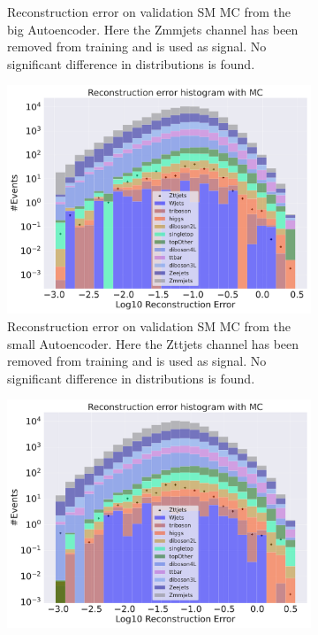 \begin{figure}[H]
\begin{subfigure}{.45\textwidth}
        \caption{Reconstruction error on validation SM MC from the big Autoencoder. Here the Zmmjets channel has been removed from training and 
        is used as signal. No significant difference in distributions is found. }
        \label{fig:vae_big_Zmmjets}
    \end{subfigure}
    \hfill
    \begin{subfigure}{.45\textwidth}
        \includegraphics[width=\textwidth]{Figures/VAE_testing/small/b_data_recon_big_rm3_feats_sig_Zttjets.pdf}
        \caption{Reconstruction error on validation SM MC from the small Autoencoder. Here the Zttjets channel has been removed from training and 
        is used as signal. No significant difference in distributions is found. }
        \label{fig:vae_small_Zttjets}
    \end{subfigure}
    \hfill 
    \begin{subfigure}{.45\textwidth}
        \includegraphics[width=\textwidth]{Figures/VAE_testing/big/b_data_recon_big_rm3_feats_sig_Zttjets.pdf}

\end{subfigure}
\end{figure}
